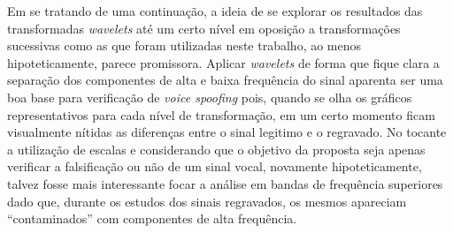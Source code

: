     \par Em se tratando de uma continuação, a ideia de se explorar os resultados das transformadas \textit{wavelets} até um certo nível em oposição a transformações sucessivas como as que foram utilizadas neste trabalho, ao menos hipoteticamente, parece promissora. Aplicar \textit{wavelets} de forma que fique clara a separação dos componentes de alta e baixa frequência do sinal aparenta ser uma boa base para verificação de \textit{voice spoofing} pois, quando se olha os gráficos representativos para cada nível de transformação, em um certo momento ficam visualmente nítidas as diferenças entre o sinal legitimo e o regravado. No tocante a utilização de escalas e considerando que o objetivo da proposta seja apenas verificar a falsificação ou não de um sinal vocal, novamente hipoteticamente, talvez fosse mais interessante focar a análise em bandas de frequência superiores dado que, durante os estudos dos sinais regravados, os mesmos apareciam “contaminados” com componentes de alta frequência.